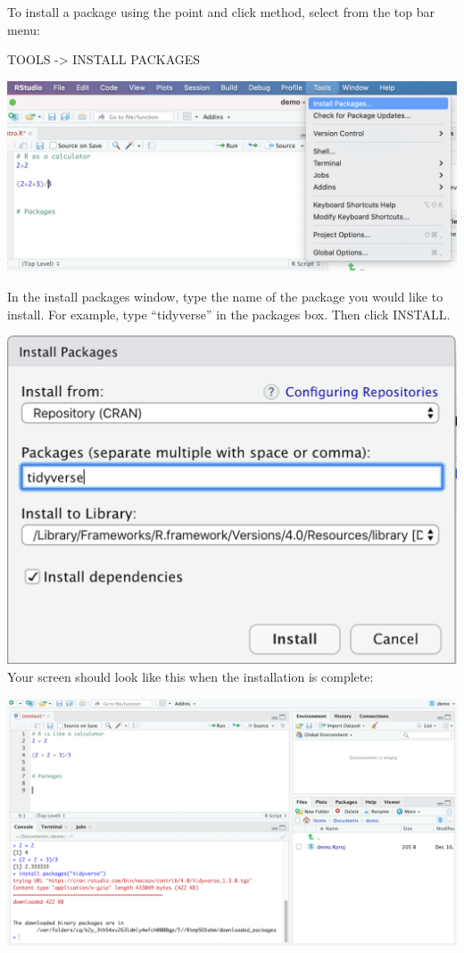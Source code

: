 \documentclass[
]{book}
\begin{document}
To install a package using the point and click method, select from the top bar menu:

TOOLS -\textgreater{} INSTALL PACKAGES

\includegraphics{img/NAVIGATING AND COMMANDS R112.png}

In the install packages window, type the name of the package you would like to install. For example, type ``tidyverse'' in the packages box. Then click INSTALL.

\includegraphics{img/NAVIGATING AND COMMANDS R113.png}\\
Your screen should look like this when the installation is complete:

\includegraphics{img/NAVIGATING AND COMMANDS R114.png}
\end{document}
